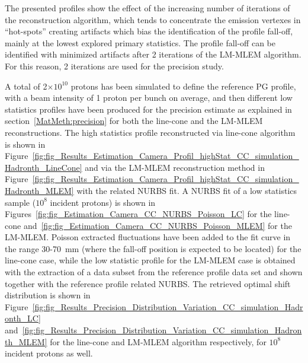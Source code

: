 The presented profiles show the effect of the increasing number of iterations of the reconstruction algorithm, which tends to concentrate the emission vertexes in \enquote{hot-spots} creating artifacts which bias the identification of the profile fall-off, mainly at the lowest explored primary statistics. The profile fall-off can be identified with minimized artifacts after 2 iterations of the LM-MLEM algorithm. For this reason, 2 iterations are used for the precision study.

A total of 2$\times10^{10}$ protons has been simulated to define the reference PG profile, with a beam intensity of 1 proton per bunch on average, and then different low statistics profiles have been produced for the precision estimate as explained in section~\ref{MatMeth:precision} for both the line-cone and the LM-MLEM reconstructions. 
The high statistics profile reconstructed via line-cone algorithm is shown in Figure~\ref{fig:fig_Results_Estimation_Camera_Profil_highStat_CC_simulation_Hadronth_LineCone} and via the LM-MLEM reconstruction method in Figure~\ref{fig:fig_Results_Estimation_Camera_Profil_highStat_CC_simulation_Hadronth_MLEM} with the related NURBS fit. A NURBS fit of a low statistics sample ($10^8$ incident protons) is shown in Figures~\ref{fig:fig_Estimation_Camera_CC_NURBS_Poisson_LC} for the line-cone and~\ref{fig:fig_Estimation_Camera_CC_NURBS_Poisson_MLEM} for the LM-MLEM. Poisson extracted fluctuations have been added to the fit curve in the range 30-70~mm (where the fall-off position is expected to be located) for the line-cone case, while the low statistic profile for the LM-MLEM case is obtained with the extraction of a data subset from the reference profile data set and shown together with the reference profile related NURBS.
The retrieved optimal shift distribution is shown in Figure~\ref{fig:fig_Results_Precision_Distribution_Variation_CC_simulation_Hadronth_LC} and~\ref{fig:fig_Results_Precision_Distribution_Variation_CC_simulation_Hadronth_MLEM} for the line-cone and LM-MLEM algorithm respectively, for $10^8$ incident protons as well.

